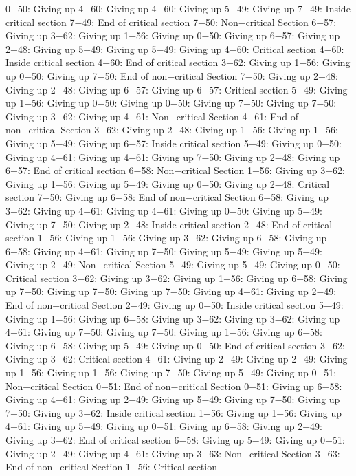0−50: Giving up
4−60: Giving up
4−60: Giving up
5−49: Giving up
7−49: Inside critical section
7−49: End of critical section
7−50: Non−critical Section
6−57: Giving up
3−62: Giving up
1−56: Giving up
0−50: Giving up
6−57: Giving up
2−48: Giving up
5−49: Giving up
5−49: Giving up
4−60: Critical section
4−60: Inside critical section
4−60: End of critical section
3−62: Giving up
1−56: Giving up
0−50: Giving up
7−50: End of non−critical Section
7−50: Giving up
2−48: Giving up
2−48: Giving up
6−57: Giving up
6−57: Critical section
5−49: Giving up
1−56: Giving up
0−50: Giving up
0−50: Giving up
7−50: Giving up
7−50: Giving up
3−62: Giving up
4−61: Non−critical Section
4−61: End of non−critical Section
3−62: Giving up
2−48: Giving up
1−56: Giving up
1−56: Giving up
5−49: Giving up
6−57: Inside critical section
5−49: Giving up
0−50: Giving up
4−61: Giving up
4−61: Giving up
7−50: Giving up
2−48: Giving up
6−57: End of critical section
6−58: Non−critical Section
1−56: Giving up
3−62: Giving up
1−56: Giving up
5−49: Giving up
0−50: Giving up
2−48: Critical section
7−50: Giving up
6−58: End of non−critical Section
6−58: Giving up
3−62: Giving up
4−61: Giving up
4−61: Giving up
0−50: Giving up
5−49: Giving up
7−50: Giving up
2−48: Inside critical section
2−48: End of critical section
1−56: Giving up
1−56: Giving up
3−62: Giving up
6−58: Giving up
6−58: Giving up
4−61: Giving up
7−50: Giving up
5−49: Giving up
5−49: Giving up
2−49: Non−critical Section
5−49: Giving up
5−49: Giving up
0−50: Critical section
3−62: Giving up
3−62: Giving up
1−56: Giving up
6−58: Giving up
7−50: Giving up
7−50: Giving up
7−50: Giving up
4−61: Giving up
2−49: End of non−critical Section
2−49: Giving up
0−50: Inside critical section
5−49: Giving up
1−56: Giving up
6−58: Giving up
3−62: Giving up
3−62: Giving up
4−61: Giving up
7−50: Giving up
7−50: Giving up
1−56: Giving up
6−58: Giving up
6−58: Giving up
5−49: Giving up
0−50: End of critical section
3−62: Giving up
3−62: Critical section
4−61: Giving up
2−49: Giving up
2−49: Giving up
1−56: Giving up
1−56: Giving up
7−50: Giving up
5−49: Giving up
0−51: Non−critical Section
0−51: End of non−critical Section
0−51: Giving up
6−58: Giving up
4−61: Giving up
2−49: Giving up
5−49: Giving up
7−50: Giving up
7−50: Giving up
3−62: Inside critical section
1−56: Giving up
1−56: Giving up
4−61: Giving up
5−49: Giving up
0−51: Giving up
6−58: Giving up
2−49: Giving up
3−62: End of critical section
6−58: Giving up
5−49: Giving up
0−51: Giving up
2−49: Giving up
4−61: Giving up
3−63: Non−critical Section
3−63: End of non−critical Section
1−56: Critical section
